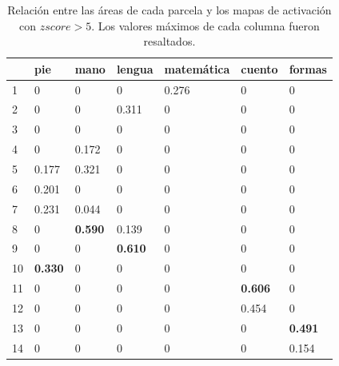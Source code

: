 \begin{table}[]
\centering
\begin{tabular}{|l|l|l|l|l|l|l|}
\hline
   & pie   & mano  & lengua & matem\'atica & cuento & formas \\ \hline
1  & 0     & 0     & 0      & 0.276      & 0      & 0      \\ \hline
2  & 0     & 0     & 0.311  & 0          & 0      & 0      \\ \hline
3  & 0     & 0     & 0      & 0          & 0      & 0      \\ \hline
4  & 0     & 0.172 & 0      & 0          & 0      & 0      \\ \hline
5  & 0.177 & 0.321 & 0      & 0          & 0      & 0      \\ \hline
6  & 0.201 & 0     & 0      & 0          & 0      & 0      \\ \hline
7  & 0.231 & 0.044 & 0      & 0          & 0      & 0      \\ \hline
8  & 0     & {\bf 0.590} & 0.139  & 0          & 0      & 0      \\ \hline
9  & 0     & 0     & {\bf 0.610}   & 0          & 0      & 0      \\ \hline
10 & {\bf 0.330}  & 0     & 0      & 0          & 0      & 0      \\ \hline
11 & 0     & 0     & 0      & 0          & {\bf 0.606}  & 0      \\ \hline
12 & 0     & 0     & 0      & 0          & 0.454  & 0      \\ \hline
13 & 0     & 0     & 0      & 0          & 0      & {\bf 0.491}  \\ \hline
14 & 0     & 0     & 0      & 0          & 0      & 0.154  \\ \hline
\end{tabular}
\caption{Relaci\'on entre las \'areas de cada parcela y los mapas de
         activaci\'on con $zscore > 5$. Los valores m\'aximos de cada 
         columna fueron resaltados.}
\label{tb:zscore5}         
\end{table}


